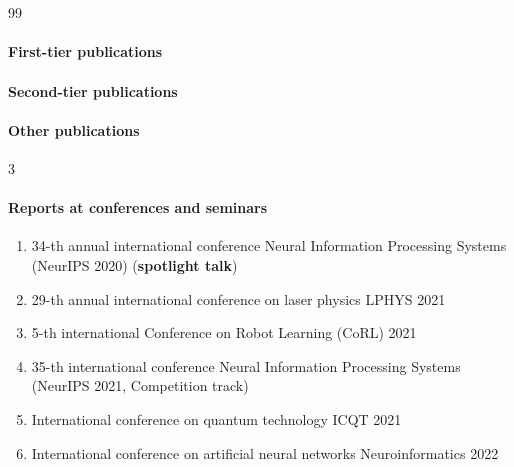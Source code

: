 \section*{}

\expandafter\def\csname blx@maxbibnames\endcsname{99}%
\paragraph{First-tier publications} 
\begin{refsection} 
    \nocite{confbib1}
    \printbibliography[heading=none]
\end{refsection}

\paragraph{Second-tier publications}
\begin{refsection} 
    \nocite{confbib4}
    \printbibliography[heading=none]
\end{refsection}

\paragraph{Other publications}
\begin{refsection} 
    \nocite{confbib2}
    \nocite{confbib3}
    \nocite{progbib1}
    \printbibliography[heading=none]
\end{refsection}

\expandafter\def\csname blx@maxbibnames\endcsname{3}%

\paragraph{Reports at conferences and seminars}
\begin{enumerate}[labelindent=3pt, labelsep=10pt, topsep=10pt, itemsep=5pt]
    \item 34-th annual international conference Neural Information Processing Systems (NeurIPS 2020) (\textbf{spotlight talk})
    \item 29-th annual international conference on laser physics LPHYS 2021
    \item 5-th international Conference on Robot Learning (CoRL) 2021
    \item 35-th international conference Neural Information Processing Systems (NeurIPS 2021, Competition track)
    \item International conference on quantum technology ICQT 2021
    \item International conference on artificial neural networks Neuroinformatics 2022
\end{enumerate}

